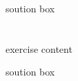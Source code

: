 \documentclass[12pt]{article}
\begin{document}
\begin{correctionbox}
	soution box
\end{correctionbox}

\section{}
exercise content


\begin{correctionbox}
	soution box
\end{correctionbox}

\end{document}
